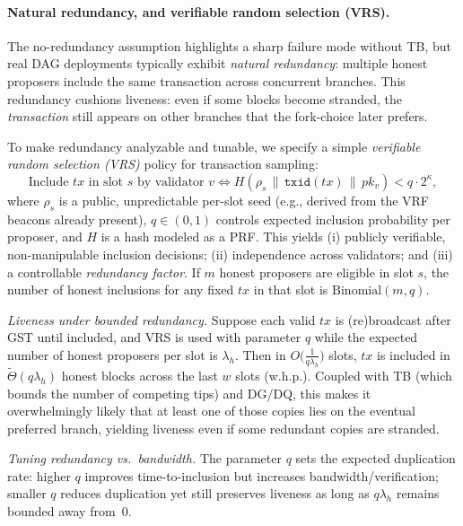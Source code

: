 \paragraph{Natural redundancy, and verifiable random selection (VRS).}
The no-redundancy assumption highlights a sharp failure mode without TB, but real DAG deployments
typically exhibit \emph{natural redundancy}: multiple honest proposers include the same transaction across
concurrent branches. This redundancy cushions liveness: even if some blocks become stranded, the \emph{transaction}
still appears on other branches that the fork-choice later prefers. 

To make redundancy analyzable and tunable, we specify a simple \emph{verifiable random selection (VRS)}
policy for transaction sampling:
\[
\text{Include } tx \text{ in slot } s \text{ by validator } v \iff H(\rho_s \,\|\, \texttt{txid}(tx) \,\|\, pk_v) < q\cdot 2^\kappa ,
\]
where $\rho_s$ is a public, unpredictable per-slot seed (e.g., derived from the VRF beacons already present),
$q\in(0,1)$ controls expected inclusion probability per proposer, and $H$ is a hash modeled as a PRF.
This yields (i) publicly verifiable, non-manipulable inclusion decisions; (ii) independence across validators;
and (iii) a controllable \emph{redundancy factor}. If $m$ honest proposers are eligible in slot $s$, the number of
honest inclusions for any fixed $tx$ in that slot is $\mathrm{Binomial}(m,q)$.

\emph{Liveness under bounded redundancy.} Suppose each valid $tx$ is (re)broadcast after GST until included,
and VRS is used with parameter $q$ while the expected number of honest proposers per slot is $\lambda_h$.
Then in $O\!\big(\tfrac{1}{q\lambda_h}\big)$ slots, $tx$ is included in $\tilde\Theta(q\lambda_h)$ honest blocks across the last
$w$ slots (w.h.p.). Coupled with TB (which bounds the number of competing tips) and DG/DQ, this makes
it overwhelmingly likely that at least one of those copies lies on the eventual preferred branch, yielding
liveness even if some redundant copies are stranded.

\emph{Tuning redundancy vs.\ bandwidth.} The parameter $q$ sets the expected duplication rate:
higher $q$ improves time-to-inclusion but increases bandwidth/verification; smaller $q$ reduces duplication
yet still preserves liveness as long as $q\lambda_h$ remains bounded away from~$0$.





